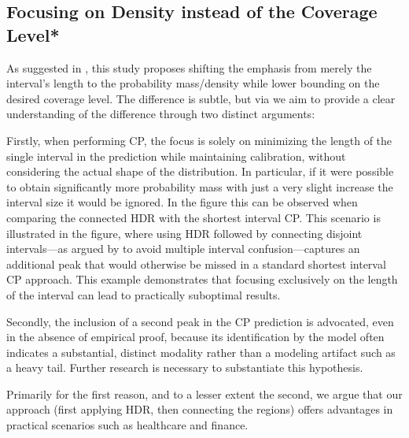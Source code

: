 \subsection{Focusing on Density instead of the Coverage Level*}\label{sec:density_focus}

As suggested in , this study proposes shifting the emphasis from merely the interval's length to the probability mass/density while lower bounding on the desired coverage level. The difference is subtle, but via  we aim to provide a clear understanding of the difference through two distinct arguments:

Firstly, when performing CP, the focus is solely on minimizing the length of the single interval in the prediction while maintaining calibration, without considering the actual shape of the distribution. In particular, if it were possible to obtain significantly more probability mass with just a very slight increase the interval size it would be ignored. In the figure this can be observed when comparing the connected HDR with the shortest interval CP. This scenario is illustrated in the figure, where using HDR followed by connecting disjoint intervals—as argued by \cite{sesia2021conformal} to avoid multiple interval confusion—captures an additional peak that would otherwise be missed in a standard shortest interval CP approach. This example demonstrates that focusing exclusively on the length of the interval can lead to practically suboptimal results.

Secondly, the inclusion of a second peak in the CP prediction is advocated, even in the absence of empirical proof, because its identification by the model often indicates a substantial, distinct modality rather than a modeling artifact such as a heavy tail. Further research is necessary to substantiate this hypothesis.

Primarily for the first reason, and to a lesser extent the second, we argue that our approach (first applying HDR, then connecting the regions) offers advantages in practical scenarios such as healthcare and finance.

